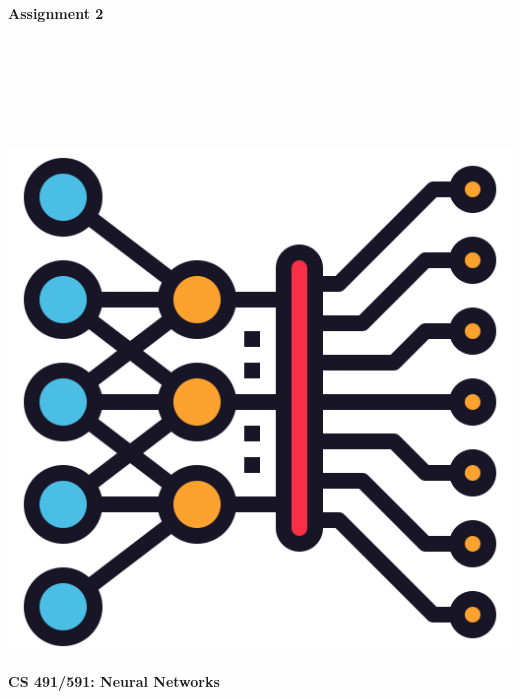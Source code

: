 \documentclass{article}
\begin{document}
\begin{titlepage}
\begin{center}
\vspace*{1cm}
            
\Huge
\textbf{Assignment 2}
            
\vspace{1cm}

\Large
{}

\vspace{2cm}

 \\
 \\
 \\
 \\
 \\

\vspace{2cm}

\includegraphics[scale=0.25]{../figs/icon.png}\\[0.5cm]

\vspace{9cm}

\textbf{CS 491/591: Neural Networks} \\

\end{center}
\end{titlepage}
\end{document}
